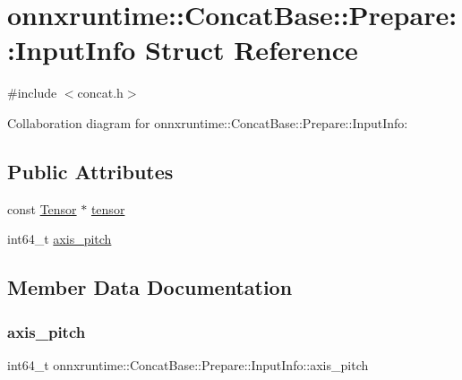 \hypertarget{structonnxruntime_1_1ConcatBase_1_1Prepare_1_1InputInfo}{}\section{onnxruntime\+:\+:Concat\+Base\+:\+:Prepare\+:\+:Input\+Info Struct Reference}
\label{structonnxruntime_1_1ConcatBase_1_1Prepare_1_1InputInfo}


{\ttfamily \#include $<$concat.\+h$>$}



Collaboration diagram for onnxruntime\+:\+:Concat\+Base\+:\+:Prepare\+:\+:Input\+Info\+:
\subsection*{Public Attributes}
\begin{DoxyCompactItemize}
\item 
const \mbox{\hyperlink{classonnxruntime_1_1Tensor}{Tensor}} $\ast$ \mbox{\hyperlink{structonnxruntime_1_1ConcatBase_1_1Prepare_1_1InputInfo_abdad6af912bc7a1c6eea59c1e720e24f}{tensor}}
\item 
int64\+\_\+t \mbox{\hyperlink{structonnxruntime_1_1ConcatBase_1_1Prepare_1_1InputInfo_ad540d71e7f2ec8c7360bfe0c09de0435}{axis\+\_\+pitch}}
\end{DoxyCompactItemize}


\subsection{Member Data Documentation}
\mbox{\label{structonnxruntime_1_1ConcatBase_1_1Prepare_1_1InputInfo_ad540d71e7f2ec8c7360bfe0c09de0435}} 
\subsubsection{\texorpdfstring{axis\+\_\+pitch}{axis\_pitch}}
{\footnotesize\ttfamily int64\+\_\+t onnxruntime\+::\+Concat\+Base\+::\+Prepare\+::\+Input\+Info\+::axis\+\_\+pitch}

